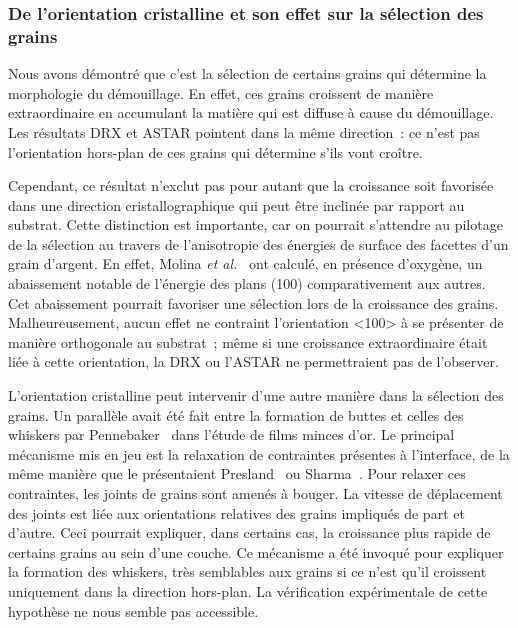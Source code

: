 \subsubsection{De l'orientation cristalline et son effet sur la sélection des grains}
Nous avons démontré que c'est la sélection de certains grains qui détermine la morphologie du démouillage. En effet, ces grains croissent de manière extraordinaire en accumulant la matière qui est diffuse à cause du démouillage. Les résultats DRX et ASTAR pointent dans la même direction~: ce n'est pas l'orientation hors-plan de ces grains qui détermine s'ils vont croître.\par 
Cependant, ce résultat n'exclut pas pour autant que la croissance soit favorisée dans une direction cristallographique qui peut être inclinée par rapport au substrat. Cette distinction est importante, car on pourrait s'attendre au pilotage de la sélection au travers de l'anisotropie des énergies de surface des facettes d'un grain d'argent. En effet, Molina \textit{et al.}~\cite{molina2011size} ont calculé, en présence d'oxygène, un abaissement notable de l'énergie des plans (100) comparativement aux autres. Cet abaissement pourrait favoriser une sélection lors de la croissance des grains. Malheureusement, aucun effet ne contraint l'orientation <100> à se présenter de manière orthogonale au substrat~; même si une croissance extraordinaire était liée à cette orientation, la DRX ou l'ASTAR ne permettraient pas de l'observer.\par 


L'orientation cristalline peut intervenir d'une autre manière dans la sélection des grains. Un parallèle avait été fait entre la formation de buttes et celles des whiskers par Pennebaker~\cite{pennebaker1969hillock} dans l'étude de films minces d'or. Le principal mécanisme mis en jeu est la relaxation de contraintes présentes à l'interface, de la même manière que le présentaient Presland~\cite{presland1972hillock} ou Sharma~\cite{sharma1980agglomeration}. Pour relaxer ces contraintes, les joints de grains sont amenés à bouger. La vitesse de déplacement des joints est liée aux orientations relatives des grains impliqués de part et d'autre. Ceci pourrait expliquer, dans certains cas, la croissance plus rapide de certains grains au sein d'une couche. Ce mécanisme a été invoqué pour expliquer la formation des whiskers, très semblables aux grains si ce n'est qu'il croissent uniquement dans la direction hors-plan. La vérification expérimentale de cette hypothèse ne nous semble pas accessible.\par


